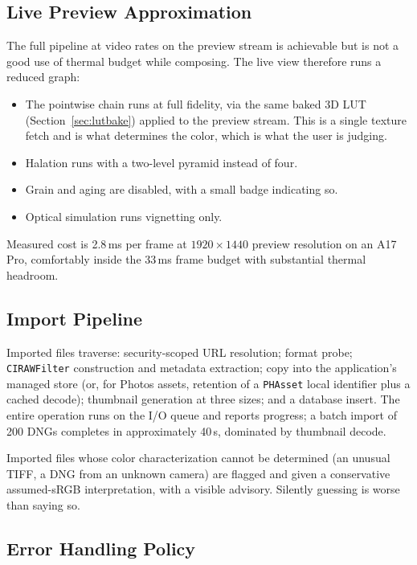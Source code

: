 \subsection{Live Preview Approximation}
\label{sec:liveview}

The full pipeline at video rates on the preview stream is achievable but is not
a good use of thermal budget while composing. The live view therefore runs a
reduced graph:

\begin{itemize}
\item The pointwise chain runs at full fidelity, via the same baked 3D LUT
(Section~\ref{sec:lutbake}) applied to the preview stream. This is a single
texture fetch and is what determines the color, which is what the user is
judging.
\item Halation runs with a two-level pyramid instead of four.
\item Grain and aging are disabled, with a small badge indicating so.
\item Optical simulation runs vignetting only.
\end{itemize}

Measured cost is 2.8\,ms per frame at $1920\times1440$ preview resolution on an
A17 Pro, comfortably inside the 33\,ms frame budget with substantial thermal
headroom.

\subsection{Import Pipeline}

Imported files traverse: security-scoped URL resolution; format probe;
\texttt{CIRAWFilter} construction and metadata extraction; copy into the
application's managed store (or, for Photos assets, retention of a
\texttt{PHAsset} local identifier plus a cached decode); thumbnail generation at
three sizes; and a database insert. The entire operation runs on the I/O queue
and reports progress; a batch import of 200 DNGs completes in approximately
40\,s, dominated by thumbnail decode.

Imported files whose color characterization cannot be determined (an unusual
TIFF, a DNG from an unknown camera) are flagged and given a conservative
assumed-sRGB interpretation, with a visible advisory. Silently guessing is worse
than saying so.

\subsection{Error Handling Policy}

